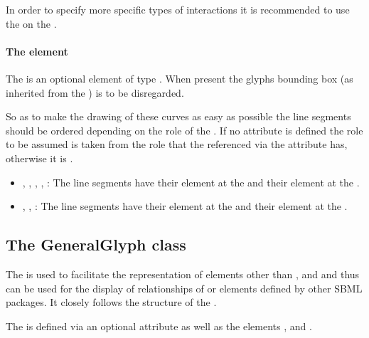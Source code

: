 In order to specify more specific types of interactions it is recommended to use the  on the \SpeciesReference.

\paragraph{The  element}
The  is an optional element of type \Curve. When present 
the glyphs bounding box (as inherited from the \GraphicalObject) is to 
be disregarded. 

So as to make the drawing of these curves as easy as possible the line 
segments should be ordered depending on the role of the 
\SpeciesReferenceGlyph. If no  attribute is defined the role 
to be assumed is taken from the role that the \SpeciesReference 
referenced via the attribute  has, otherwise it 
is . 


\begin{itemize}
	\item {, , , 
	, : The line segments have their 
	 element at the \ReactionGlyph and their  
	element at the \SpeciesGlyph.} 
	\item {, 
	, : The line segments have their 
	 element at the \SpeciesGlyph and their  element 
	at the \ReactionGlyph.} 
\end{itemize}

\subsection{The GeneralGlyph class}
\label{generalglyph-class}
The \GeneralGlyph is used to facilitate the representation of elements 
other than \Compartment, \Species and \Reaction and thus can be used for 
the display of relationships of \Rule or elements defined by other SBML 
packages. It closely follows the structure of the \ReactionGlyph. 

The \GeneralGlyph is defined via an optional attribute  
as well as the elements ,  and 
. 


